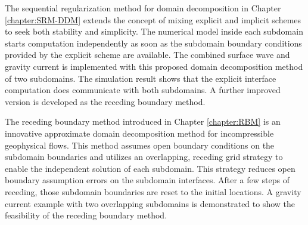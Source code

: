 The sequential regularization method for domain decomposition in Chapter \ref{chapter:SRM-DDM} extends the concept of mixing explicit and implicit schemes to seek both stability and simplicity.
The numerical model inside each subdomain starts
computation independently as soon as the subdomain boundary conditions provided by the explicit scheme are available.
The combined surface wave and gravity current is implemented with this proposed domain decomposition method of two subdomains. The simulation result shows that the explicit interface computation does communicate with both subdomains. A further improved version is developed as the receding boundary method.


The receding boundary method introduced in Chapter \ref{chapter:RBM} is an innovative approximate domain decomposition method for incompressible geophysical flows. This method assumes open boundary conditions on the subdomain boundaries and utilizes an overlapping, receding grid strategy to enable the independent solution of each subdomain. This strategy reduces open boundary assumption errors on the subdomain interfaces. After a few steps of receding, those subdomain boundaries are reset to the initial locations. A gravity current example with two overlapping subdomains is demonstrated to show the feasibility of the receding boundary method.


 